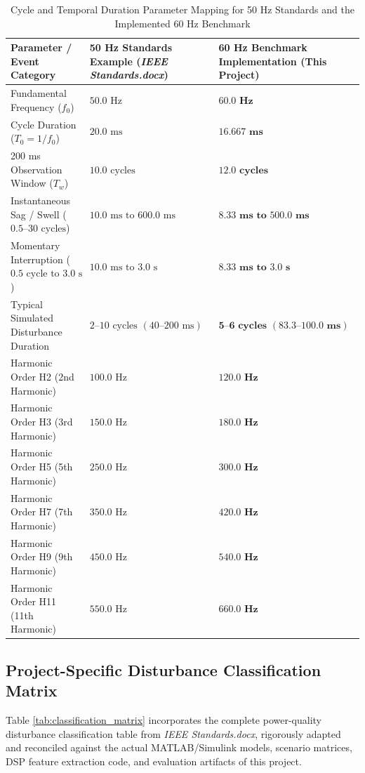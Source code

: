 \documentclass[12pt,a4paper]{report}
\begin{document}
\begin{table}[H]
\centering
\caption{Cycle and Temporal Duration Parameter Mapping for 50 Hz Standards and the Implemented 60 Hz Benchmark}
\label{tab:freq_mapping}
\small
\begin{tabularx}{\textwidth}{lXX}
\toprule
\textbf{Parameter / Event Category} & \textbf{50 Hz Standards Example (\textit{IEEE Standards.docx})} & \textbf{60 Hz Benchmark Implementation (This Project)} \\
\midrule
Fundamental Frequency ($f_0$) & $50.0\text{ Hz}$ & $\mathbf{60.0\text{ Hz}}$ \\
Cycle Duration ($T_0 = 1/f_0$) & $20.0\text{ ms}$ & $\mathbf{16.667\text{ ms}}$ \\
200 ms Observation Window ($T_w$) & $10.0\text{ cycles}$ & $\mathbf{12.0\text{ cycles}}$ \\
Instantaneous Sag / Swell ($0.5\text{--}30\text{ cycles}$) & $10.0\text{ ms to }600.0\text{ ms}$ & $\mathbf{8.33\text{ ms to }500.0\text{ ms}}$ \\
Momentary Interruption ($0.5\text{ cycle to }3.0\text{ s}$) & $10.0\text{ ms to }3.0\text{ s}$ & $\mathbf{8.33\text{ ms to }3.0\text{ s}}$ \\
Typical Simulated Disturbance Duration & $2\text{--}10\text{ cycles } (40\text{--}200\text{ ms})$ & $\mathbf{5\text{--}6\text{ cycles } (83.3\text{--}100.0\text{ ms})}$ \\
Harmonic Order H2 (2nd Harmonic) & $100.0\text{ Hz}$ & $\mathbf{120.0\text{ Hz}}$ \\
Harmonic Order H3 (3rd Harmonic) & $150.0\text{ Hz}$ & $\mathbf{180.0\text{ Hz}}$ \\
Harmonic Order H5 (5th Harmonic) & $250.0\text{ Hz}$ & $\mathbf{300.0\text{ Hz}}$ \\
Harmonic Order H7 (7th Harmonic) & $350.0\text{ Hz}$ & $\mathbf{420.0\text{ Hz}}$ \\
Harmonic Order H9 (9th Harmonic) & $450.0\text{ Hz}$ & $\mathbf{540.0\text{ Hz}}$ \\
Harmonic Order H11 (11th Harmonic) & $550.0\text{ Hz}$ & $\mathbf{660.0\text{ Hz}}$ \\
\bottomrule
\end{tabularx}
\end{table}

\subsection{Project-Specific Disturbance Classification Matrix}
Table \ref{tab:classification_matrix} incorporates the complete power-quality disturbance classification table from \textit{IEEE Standards.docx}, rigorously adapted and reconciled against the actual MATLAB/Simulink models, scenario matrices, DSP feature extraction code, and evaluation artifacts of this project.
\end{document}
